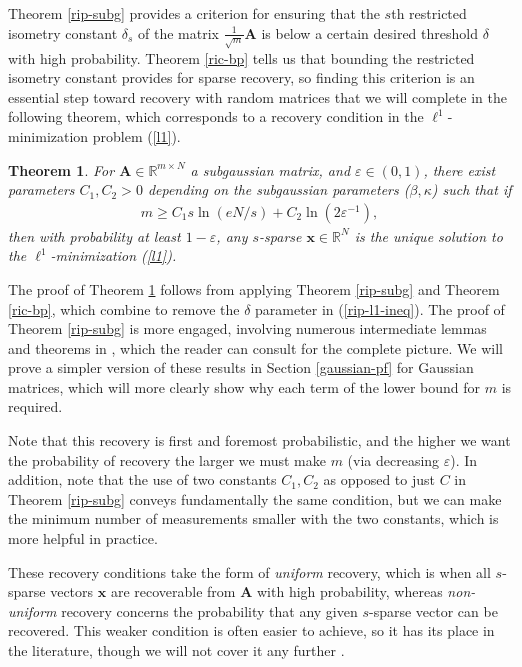 \documentclass[12pt,a4paper]{amsart}
\numberwithin{equation}{section}
\theoremstyle{plain}
\newtheorem{Th}{Theorem}[section]
\theoremstyle{definition}
\newcommand{\BR}{\mathbb R}
\newcommand{\bdx}{\mathbf{x}}
\newcommand{\bdA}{\mathbf{A}}
\begin{document}
Theorem \ref{rip-subg} provides a criterion for ensuring that the $s$th restricted isometry constant $\delta_s$ of the matrix $\frac{1}{\sqrt{m}}\bdA$ is below a certain desired threshold $\delta$ with high probability. Theorem \ref{ric-bp} tells us that bounding the restricted isometry constant provides for sparse recovery, so finding this criterion is an essential step toward recovery with random matrices that we will complete in the following theorem, which corresponds to a recovery condition in the $\ell^1$-minimization problem (\ref{l1}).

\begin{Th}\label{rip-l1} For $\bdA\in\BR^{m\times N}$ a subgaussian matrix, and $\varepsilon\in(0,1)$, there exist parameters $C_1,C_2>0$ depending on the subgaussian parameters ($\beta,\kappa$) such that if
\begin{align}\label{rip-l1-ineq}
    m\geq C_1s\ln(eN/s)+C_2\ln(2\varepsilon^{-1}),
\end{align}
then with probability at least $1-\varepsilon$, any $s$-sparse $\bdx\in\BR^N$ is the unique solution to the $\ell^1$-minimization (\ref{l1}).
\end{Th}

The proof of Theorem \ref{rip-l1} follows from applying Theorem \ref{rip-subg} and Theorem \ref{ric-bp}, which combine to remove the $\delta$ parameter in (\ref{rip-l1-ineq}). The proof of Theorem \ref{rip-subg} is more engaged, involving numerous intermediate lemmas and theorems in \cite{fou-rau}, which the reader can consult for the complete picture. We will prove a simpler version of these results in Section \ref{gaussian-pf} for Gaussian matrices, which will more clearly show why each term of the lower bound for $m$ is required.

Note that this recovery is first and foremost probabilistic, and the higher we want the probability of recovery the larger we must make $m$ (via decreasing $\varepsilon$). In addition, note that the use of two constants $C_1,C_2$ as opposed to just $C$ in Theorem \ref{rip-subg} conveys fundamentally the same condition, but we can make the minimum number of measurements smaller with the two constants, which is more helpful in practice.

These recovery conditions take the form of \textit{uniform} recovery, which is when all $s$-sparse vectors $\bdx$ are recoverable from $\bdA$ with high probability, whereas \textit{non-uniform} recovery concerns the probability that any given $s$-sparse vector can be recovered. This weaker condition is often easier to achieve, so it has its place in the literature, though we will not cover it any further \cite{fou-rau}.
\end{document}
